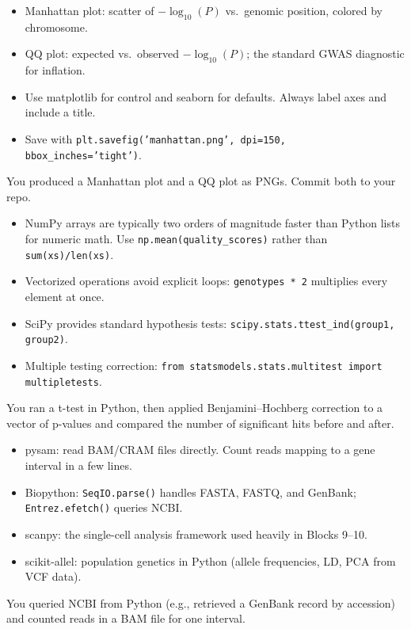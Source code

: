 \begin{itemize}[nosep]
  \item Manhattan plot: scatter of $-\log_{10}(P)$ vs.\ genomic position, colored by chromosome.
  \item QQ plot: expected vs.\ observed $-\log_{10}(P)$; the standard GWAS diagnostic for inflation.
  \item Use matplotlib for control and seaborn for defaults. Always label axes and include a title.
  \item Save with \texttt{plt.savefig('manhattan.png', dpi=150, bbox\_inches='tight')}.
\end{itemize}
\begin{winbox}[Checkpoint]
You produced a Manhattan plot and a QQ plot as PNGs. Commit both to your repo.
\end{winbox}

\begin{itemize}[nosep]
  \item NumPy arrays are typically two orders of magnitude faster than Python lists for numeric math. Use \texttt{np.mean(quality\_scores)} rather than \texttt{sum(xs)/len(xs)}.
  \item Vectorized operations avoid explicit loops: \texttt{genotypes * 2} multiplies every element at once.
  \item SciPy provides standard hypothesis tests: \texttt{scipy.stats.ttest\_ind(group1, group2)}.
  \item Multiple testing correction: \texttt{from statsmodels.stats.multitest import multipletests}.
\end{itemize}
\begin{winbox}[Checkpoint]
You ran a t-test in Python, then applied Benjamini--Hochberg correction to a vector of p-values and compared the number of significant hits before and after.
\end{winbox}

\begin{itemize}[nosep]
  \item pysam: read BAM/CRAM files directly. Count reads mapping to a gene interval in a few lines.
  \item Biopython: \texttt{SeqIO.parse()} handles FASTA, FASTQ, and GenBank; \texttt{Entrez.efetch()} queries NCBI.
  \item scanpy: the single-cell analysis framework used heavily in Blocks 9--10.
  \item scikit-allel: population genetics in Python (allele frequencies, LD, PCA from VCF data).
\end{itemize}
\begin{winbox}[Checkpoint]
You queried NCBI from Python (e.g., retrieved a GenBank record by accession) and counted reads in a BAM file for one interval.
\end{winbox}

